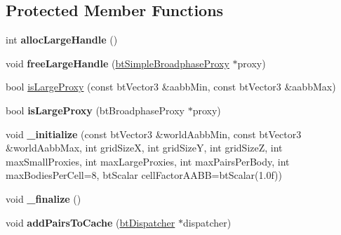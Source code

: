 \subsection*{Protected Member Functions}
\begin{DoxyCompactItemize}
\item 
\hypertarget{classbt_gpu3_d_grid_broadphase_a640c838da14e12aa1244b46bd134ee3a}{int {\bfseries alloc\+Large\+Handle} ()}\label{classbt_gpu3_d_grid_broadphase_a640c838da14e12aa1244b46bd134ee3a}

\item 
\hypertarget{classbt_gpu3_d_grid_broadphase_a886be1bf1f2ebb9c18bd7ec714961794}{void {\bfseries free\+Large\+Handle} (\hyperlink{structbt_simple_broadphase_proxy}{bt\+Simple\+Broadphase\+Proxy} $\ast$proxy)}\label{classbt_gpu3_d_grid_broadphase_a886be1bf1f2ebb9c18bd7ec714961794}

\item 
bool \hyperlink{classbt_gpu3_d_grid_broadphase_a131cfab867b25116adb72d79435be34d}{is\+Large\+Proxy} (const bt\+Vector3 \&aabb\+Min, const bt\+Vector3 \&aabb\+Max)
\item 
\hypertarget{classbt_gpu3_d_grid_broadphase_a54623ad8091800695dcb9487da21ff4b}{bool {\bfseries is\+Large\+Proxy} (bt\+Broadphase\+Proxy $\ast$proxy)}\label{classbt_gpu3_d_grid_broadphase_a54623ad8091800695dcb9487da21ff4b}

\item 
\hypertarget{classbt_gpu3_d_grid_broadphase_a015bbc0dea05a6b9c5256c4cf5b290d0}{void {\bfseries \+\_\+initialize} (const bt\+Vector3 \&world\+Aabb\+Min, const bt\+Vector3 \&world\+Aabb\+Max, int grid\+Size\+X, int grid\+Size\+Y, int grid\+Size\+Z, int max\+Small\+Proxies, int max\+Large\+Proxies, int max\+Pairs\+Per\+Body, int max\+Bodies\+Per\+Cell=8, bt\+Scalar cell\+Factor\+A\+A\+B\+B=bt\+Scalar(1.\+0f))}\label{classbt_gpu3_d_grid_broadphase_a015bbc0dea05a6b9c5256c4cf5b290d0}

\item 
\hypertarget{classbt_gpu3_d_grid_broadphase_aa12d32dc4ad28e00961834e81719de19}{void {\bfseries \+\_\+finalize} ()}\label{classbt_gpu3_d_grid_broadphase_aa12d32dc4ad28e00961834e81719de19}

\item 
\hypertarget{classbt_gpu3_d_grid_broadphase_ad57933c61551ee1fc7f92ce911213228}{void {\bfseries add\+Pairs\+To\+Cache} (\hyperlink{classbt_dispatcher}{bt\+Dispatcher} $\ast$dispatcher)}\label{classbt_gpu3_d_grid_broadphase_ad57933c61551ee1fc7f92ce911213228}


\end{DoxyCompactItemize}
